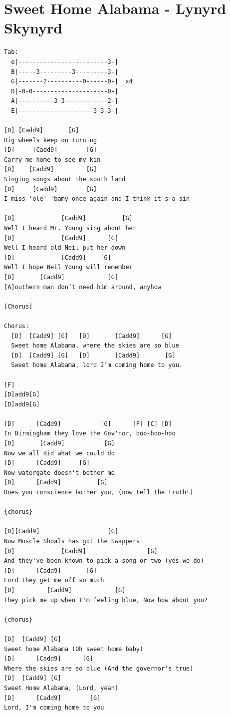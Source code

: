 \documentclass[
]{book}
\let\stdsection\section
\renewcommand\section{\clearpage\stdsection}
\begin{document}
\hypertarget{classics-sweet-home-alabama}{%
\section{Sweet Home Alabama - Lynyrd Skynyrd}\label{classics-sweet-home-alabama}}

\begin{verbatim}
Tab:
  e|-------------------------3-|
  B|-----3---------3---------3-|
  G|-------2----------0------0-|  x4
  D|-0-0---------------------0-|     
  A|----------3-3------------2-|
  E|---------------------3-3-3-|

[D] [Cadd9]       [G]
Big wheels keep on turning
[D]     [Cadd9]        [G]
Carry me home to see my kin
[D]    [Cadd9]         [G]
Singing songs about the south land
[D]     [Cadd9]        [G]                           
I miss 'ole' 'bamy once again and I think it's a sin

[D]             [Cadd9]          [G]
Well I heard Mr. Young sing about her
[D]             [Cadd9]      [G]
Well I heard old Neil put her down
[D]             [Cadd9]    [G]
Well I hope Neil Young will remember
[D]       [Cadd9]            [G]               
[A]outhern man don’t need him around, anyhow

[Chorus]

Chorus:
  [D]  [Cadd9] [G]   [D]       [Cadd9]      [G]        
  Sweet home Alabama, where the skies are so blue
  [D]  [Cadd9] [G]   [D]       [Cadd9]       [G]     
  Sweet home Alabama, lord I’m coming home to you.

[F]
[D]add9[G]
[D]add9[G]

[D]      [Cadd9]           [G]      [F] [C] [D]
In Birmingham they love the Gov'nor, boo-hoo-hoo
[D]       [Cadd9]           [G]
Now we all did what we could do
[D]      [Cadd9]     [G]
Now watergate doesn't bother me
[D]      [Cadd9]          [G]
Does you conscience bother you, (now tell the truth!)

{chorus}

[D][Cadd9]                   [G]
Now Muscle Shoals has got the Swappers
[D]             [Cadd9]                 [G]
And they've been known to pick a song or two (yes we do)
[D]      [Cadd9]       [G]
Lord they get me off so much
[D]         [Cadd9]            [G]   
They pick me up when I'm feeling blue, Now how about you?

{chorus}

[D]  [Cadd9] [G]     
Sweet home Alabama (Oh sweet home baby)
[D]      [Cadd9]      [G]   
Where the skies are so blue (And the governor's true)
[D]  [Cadd9] [G]
Sweet Home Alabama, (Lord, yeah)
[D]      [Cadd9]        [G]
Lord, I'm coming home to you
\end{verbatim}
\end{document}
